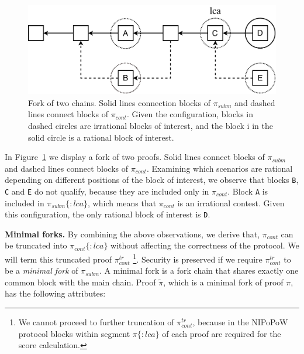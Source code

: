 \begin{figure}[h]
    \begin{center}
        \includegraphics[width=1\columnwidth]{figures/boi-position.pdf}
    \end{center}
    \caption{Fork of two chains. Solid lines connection blocks of $\pi_{subm}$
    and dashed lines connect blocks of $\pi_{cont}$. Given the configuration,
    blocks in dashed circles are irrational blocks of interest, and the block i
    in the solid circle is a rational block of interest.}
    \label{fig:boi-position}
\end{figure}

In Figure~\ref{fig:boi-position} we display a fork of two proofs. Solid lines
connect blocks of $\pi_{subm}$ and dashed lines connect blocks of $\pi_{cont}$.
Examining which scenarios are rational depending on different positions of the
block of interest, we observe that blocks \texttt{B}, \texttt{C} and \texttt{E}
do not qualify, because they are included only in $\pi_{cont}$. Block
\texttt{A} is included in $\pi_{subm}\{:lca\}$, which means that $\pi_{cont}$
is an irrational contest. Given this configuration, the only rational block of
interest is \texttt{D}.

\newcommand{\pis}{\pi_{subm}}
\newcommand{\pic}{\pi_{cont}}
\newcommand{\pitr}{\pi_{cont}^{tr}}

\noindent \textbf{Minimal forks.} By combining the above observations, we
derive that, $\pi_{cont}$ can be truncated into $\pi_{cont}\{:lca\}$ without
affecting the correctness of the protocol. We will term this truncated proof
$\pitr$ \footnote{We cannot proceed to further truncation of $\pitr$, because
    in the NIPoPoW protocol blocks within segment $\pi\{:lca\}$ of each proof
are required for the score calculation.}. Security is preserved if we require
$\pitr$ to be a \emph{minimal fork} of $\pis$. A minimal fork is a fork chain
that shares exactly one common block with the main chain. Proof $\tilde\pi$,
which is a minimal fork of proof $\pi$, has the following attributes:

